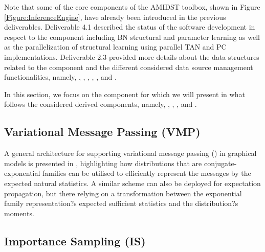 Note that some of the core components of the AMIDST toolbox, shown in Figure \ref{Figure:InferenceEngine}, have already been introduced in the previous deliverables. Deliverable 4.1 \cite{Deliverable4.1} described the status of the software development in respect to the  component including BN structural and parameter learning as well as the parallelization of structural learning using parallel TAN and PC implementations. Deliverable 2.3 \cite{Deliverable2.3} provided more details about the data structures related to the  component and the different considered data source management functionalities, namely, , , , , , and .

In this section, we focus on the  component for which we will present in what follows the considered derived components, namely, , , , and .


\subsection{Variational Message Passing (VMP)} \label{VMP}

A general architecture for supporting variational message passing () in graphical models is presented in \cite{Bishop2005}, highlighting how distributions that are conjugate-exponential families \cite{Attias2000,Beal2003,Bishop2005} can be utilised to efficiently represent the messages by the expected natural statistics. A similar scheme can also be deployed for expectation propagation, but there relying on a transformation between the exponential family representation?s expected sufficient statistics and the distribution?s moments.


\subsection{Importance Sampling (IS)} \label{IS}

